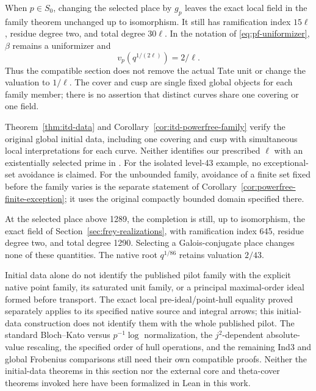 When $p\in S_0$, changing the selected place by $g_p$ leaves
the exact local field in the family theorem unchanged up to
isomorphism. It still has ramification index $15\ell$, residue
degree two, and total degree $30\ell$. In the notation of
\eqref{eq:pf-uniformizer}, $\beta$ remains a uniformizer and
\[
 v_p(q^{1/(2\ell)})=2/\ell.
\]
Thus the compatible section does not remove the actual Tate unit
or change the valuation to $1/\ell$. The cover and cusp are
single fixed global objects for each family member; there is
no assertion that distinct curves share one covering or one field.

\begin{remark}\label{rem:itd-boundary}
Theorem~\ref{thm:itd-data} and Corollary~\ref{cor:itd-powerfree-family}
verify the original global initial data, including one covering
and cusp with simultaneous local interpretations for each curve.
Neither identifies our prescribed $\ell$ with an existentially
selected prime in \cite[Theorem~5.7.1]{JoshiIV}.
For the isolated level-43 example, no exceptional-set avoidance
is claimed. For the unbounded family, avoidance of a finite set
fixed before the family varies is the separate statement of
Corollary~\ref{cor:powerfree-finite-exception}; it uses the
original compactly bounded domain specified there.

At the selected place above 1289, the completion is still, up
to isomorphism, the exact field of
Section~\ref{sec:frey-realizations}, with ramification index
645, residue degree two, and total degree 1290. Selecting a
Galois-conjugate place changes none of these quantities. The
native root $q^{1/86}$ retains valuation $2/43$.

Initial data alone do not identify the published pilot family
with the explicit native point family, its saturated unit family,
or a principal maximal-order ideal formed before transport.
The exact local pre-ideal/point-hull equality proved separately
applies to its specified native source and integral arrows; this
initial-data construction does not identify them with the whole
published pilot. The standard Bloch--Kato versus $p^{-1}\log$
normalization, the $j^2$-dependent absolute-value rescaling, the
specified order of hull operations, and the remaining Ind3 and
global Frobenius comparisons still need their own compatible proofs.
Neither the initial-data theorems in this section nor the external
core and theta-cover theorems invoked here have been formalized
in Lean in this work.
\end{remark}
